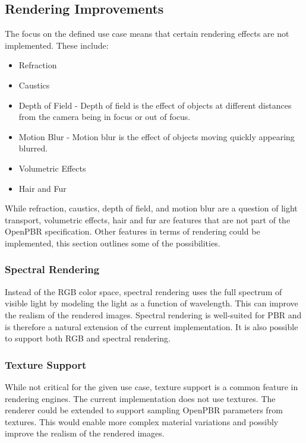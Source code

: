 \subsection*{Rendering Improvements}

The focus on the defined use case means that certain rendering effects are not implemented. These include:

\begin{itemize}
    \item{Refraction}
    \item{Caustics}
    \item{Depth of Field} - Depth of field is the effect of objects at different distances from the camera being in focus or out of focus.
    \item{Motion Blur} - Motion blur is the effect of objects moving quickly appearing blurred.
    \item{Volumetric Effects}
    \item{Hair and Fur}
\end{itemize}

While refraction, caustics, depth of field, and motion blur are a question of light transport, volumetric effects, hair and fur are features that are not part of the \gls{OpenPBR} specification. Other features in terms of rendering could be implemented, this section outlines some of the possibilities.

\subsubsection*{Spectral Rendering}

Instead of the \gls{RGB} color space, spectral rendering uses the full spectrum of visible light by modeling the light as a function of wavelength. This can improve the realism of the rendered images. Spectral rendering is well-suited for \gls{PBR} and is therefore a natural extension of the current implementation. It is also possible to support both \gls{RGB} and spectral rendering.

\subsubsection*{Texture Support}

While not critical for the given use case, texture support is a common feature in rendering engines. The current implementation does not use textures. The renderer could be extended to support sampling \gls{OpenPBR} parameters from textures. This would enable more complex material variations and possibly improve the realism of the rendered images.

